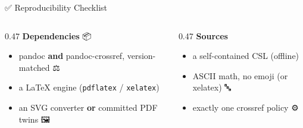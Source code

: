 \documentclass[
  10pt,
  ignorenonframetext,
  serif,
  aspectratio=169]{beamer}
\providecommand{\tightlist}{%
  \setlength{\itemsep}{0pt}\setlength{\parskip}{0pt}}
\begin{document}
\begin{frame}[fragile]{✅ Reproducibility Checklist}
\protect{}\label{reproducibility-checklist}
\begin{columns}[T]
\begin{column}{0.47\linewidth}
\textbf{Dependencies} 📦

\begin{itemize}
\tightlist
\item
  pandoc \textbf{and} pandoc-crossref, version-matched ⚖️
\item
  a LaTeX engine (\texttt{pdflatex} / \texttt{xelatex}) 📐
\item
  an SVG converter \textbf{or} committed PDF twins 🖼️
\end{itemize}
\end{column}

\begin{column}{0.47\linewidth}
\textbf{Sources} 📝

\begin{itemize}
\tightlist
\item
  a self-contained CSL (offline) 📴
\item
  ASCII math, no emoji (or xelatex) 🔤
\item
  exactly one crossref policy ⚙️
\end{itemize}
\end{column}
\end{columns}

\begin{center}
\end{center}
\end{frame}
\end{document}
